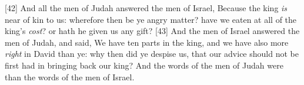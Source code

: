 [42] \textcolor[cmyk]{0.99998,1,0,0}{And all the men of Judah answered the men of Israel, Because the king \emph{is} near of kin to us: wherefore then be ye angry   matter? have we eaten at all of the king's \emph{cost}? or hath he given us any gift?}
[43] \textcolor[cmyk]{0.99998,1,0,0}{And the men of Israel answered the men of Judah, and said, We have ten parts in the king, and we have also more \emph{right} in David than ye: why then did ye despise us, that our advice should not be first had in bringing back our king? And the words of the men of Judah were  than the words of the men of Israel.}